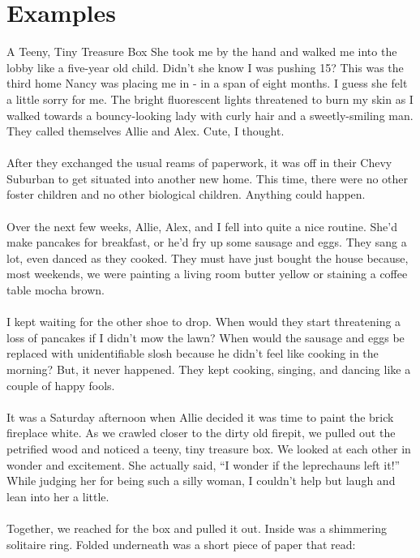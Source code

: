 \section{Examples}
	\begin{mytcbox}{A Teeny, Tiny Treasure Box}
		She took me by the hand and walked me into the lobby like a five-year old child. Didn’t she know I was pushing 15? This was the third home Nancy was placing me in - in a span of eight months. I guess she felt a little sorry for me. The bright fluorescent lights threatened to burn my skin as I walked towards a bouncy-looking lady with curly hair and a sweetly-smiling man. They called themselves Allie and Alex. Cute, I thought.
		\\
		\\		
		After they exchanged the usual reams of paperwork, it was off in their Chevy Suburban to get situated into another new home. This time, there were no other foster children and no other biological children. Anything could happen.
		\\
		\\
		Over the next few weeks, Allie, Alex, and I fell into quite a nice routine. She’d make pancakes for breakfast, or he’d fry up some sausage and eggs. They sang a lot, even danced as they cooked. They must have just bought the house because, most weekends, we were painting a living room butter yellow or staining a coffee table mocha brown.
		\\
		\\
		I kept waiting for the other shoe to drop. When would they start threatening a loss of pancakes if I didn’t mow the lawn? When would the sausage and eggs be replaced with unidentifiable slosh because he didn’t feel like cooking in the morning? But, it never happened. They kept cooking, singing, and dancing like a couple of happy fools.
		\\
		\\
		It was a Saturday afternoon when Allie decided it was time to paint the brick fireplace white. As we crawled closer to the dirty old firepit, we pulled out the petrified wood and noticed a teeny, tiny treasure box. We looked at each other in wonder and excitement. She actually said, “I wonder if the leprechauns left it!” While judging her for being such a silly woman, I couldn’t help but laugh and lean into her a little.
		\\
		\\
		Together, we reached for the box and pulled it out. Inside was a shimmering solitaire ring. Folded underneath was a short piece of paper that read:

\end{mytcbox}
